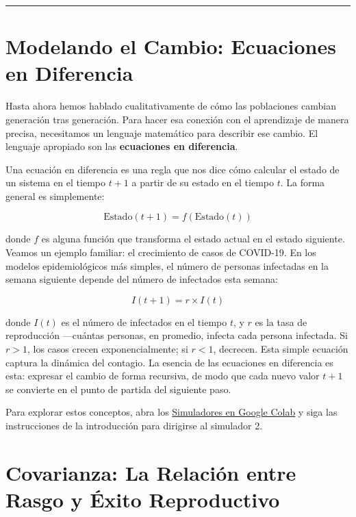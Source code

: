 \documentclass[
  letterpaper,
  DIV=11,
  numbers=noendperiod]{scrreprt}
\begin{document}
\begin{center}\rule{0.5\linewidth}{0.5pt}\end{center}

\section{Modelando el Cambio: Ecuaciones en
Diferencia}\label{modelando-el-cambio-ecuaciones-en-diferencia}

Hasta ahora hemos hablado cualitativamente de cómo las poblaciones
cambian generación tras generación. Para hacer esa conexión con el
aprendizaje de manera precisa, necesitamos un lenguaje matemático para
describir ese cambio. El lenguaje apropiado son las \textbf{ecuaciones
en diferencia}.

Una ecuación en diferencia es una regla que nos dice cómo calcular el
estado de un sistema en el tiempo \(t+1\) a partir de su estado en el
tiempo \(t\). La forma general es simplemente:

\[\text{Estado}(t+1) = f(\text{Estado}(t))\]

donde \(f\) es alguna función que transforma el estado actual en el
estado siguiente. Veamos un ejemplo familiar: el crecimiento de casos de
COVID-19. En los modelos epidemiológicos más simples, el número de
personas infectadas en la semana siguiente depende del número de
infectados esta semana:

\[I(t+1) = r \times I(t)\]

donde \(I(t)\) es el número de infectados en el tiempo \(t\), y \(r\) es
la tasa de reproducción ---cuántas personas, en promedio, infecta cada
persona infectada. Si \(r > 1\), los casos crecen exponencialmente; si
\(r < 1\), decrecen. Esta simple ecuación captura la dinámica del
contagio. La esencia de las ecuaciones en diferencia es esta: expresar
el cambio de forma recursiva, de modo que cada nuevo valor \(t+1\) se
convierte en el punto de partida del siguiente paso.

Para explorar estos conceptos, abra los
\href{https://colab.research.google.com/drive/1jzI4TI74eFj9ORO63YleCOq99sq0aXO0}{Simuladores
en Google Colab} y siga las instrucciones de la introducción para
dirigirse al simulador 2.

\section{Covarianza: La Relación entre Rasgo y Éxito
Reproductivo}\label{covarianza-la-relaciuxf3n-entre-rasgo-y-uxe9xito-reproductivo}
\end{document}
